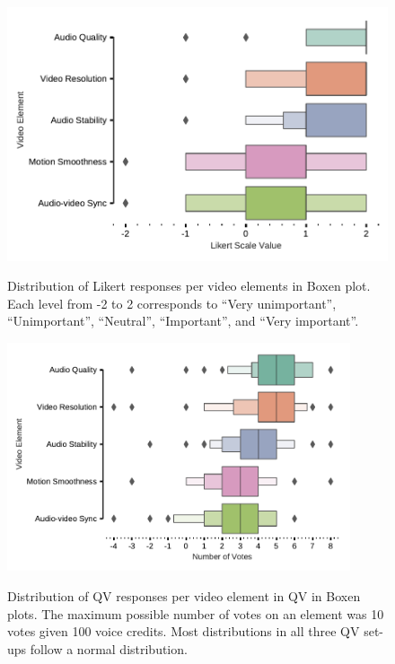 \begin{figure}[htpb]
\centering
\begin{minipage}[b]{0.44\linewidth}
\includegraphics[width=\textwidth, keepaspectratio=true]{content/image/likert_distribution_per_element (1).pdf}
    \caption{
      Distribution of Likert responses per video elements in Boxen plot. 
      Each level from -2 to 2 corresponds to 
      ``Very unimportant'', ``Unimportant'', ``Neutral'', ``Important'', and ``Very important''.
    }
    \label{fig:likert_exp2}
\end{minipage}
\quad
\begin{minipage}[b]{0.52\linewidth}
\includegraphics[width=0.9\textwidth, keepaspectratio=true]{content/image/qv_distribution_per_element.pdf}
    \caption{
      Distribution of QV responses per video element in QV in Boxen plots. The maximum possible number of votes on an element was 10 votes given 100 voice credits. Most distributions in all three QV set-ups follow a normal distribution. 
    }
    \label{fig:qv3_exp2}
\end{minipage}
\end{figure}


